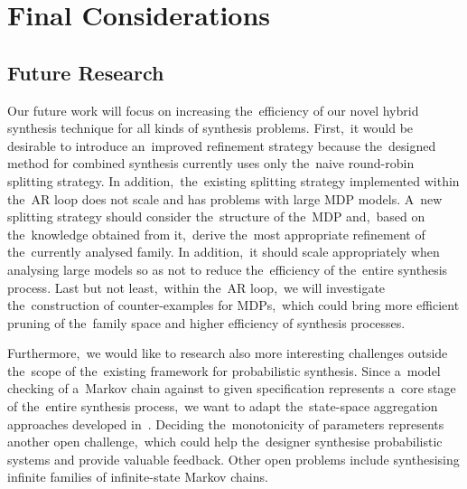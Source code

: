 \chapter{Final Considerations}\label{chap:conclusion}

\section{Future Research}
Our future work will focus on increasing the~efficiency of our novel hybrid synthesis technique for all kinds of synthesis problems.
First,~it would be desirable to introduce an~improved refinement strategy because the~designed method for combined synthesis currently uses only the~naive round-robin splitting strategy.
In addition,~the~existing splitting strategy implemented within the~AR loop does not scale and has problems with large MDP models.
A~new splitting strategy should consider the~structure of the~MDP and,~based on the~knowledge obtained from it,~derive the~most appropriate refinement of the~currently analysed family.
In addition,~it should scale appropriately when analysing large models so as not to reduce the~efficiency of the~entire synthesis process.
Last but not least,~within the~AR loop,~we will investigate the~construction of counter-examples for MDPs,~which could bring more efficient pruning of the~family space and higher efficiency of synthesis processes.

Furthermore,~we would like to research also more interesting challenges outside the~scope of the~existing framework for probabilistic synthesis.
Since a~model checking of a~Markov chain against to given specification represents a~core stage of the~entire synthesis process,~we want to adapt the~state-space aggregation approaches developed in~\cite{roman-DP}.
Deciding the~monotonicity of parameters represents another open challenge,~which could help the~designer synthesise probabilistic systems and provide valuable feedback.
Other open problems include synthesising infinite families of infinite-state Markov chains.

